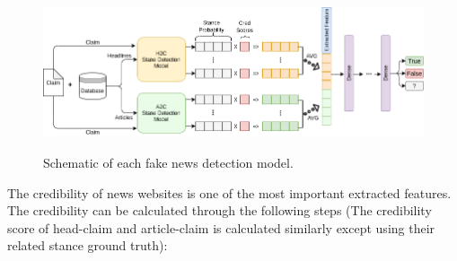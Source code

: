 \begin{figure}%
	\centering
	{\includegraphics[width=14.5cm]{statistics/schema/fn.png} }
	\caption{Schematic of each fake news detection model.}%
	\label{fig:fnschm}%
\end{figure}

The credibility of news websites is one of the most important extracted features. The credibility can be calculated through the following steps (The credibility score of head-claim and article-claim is calculated similarly except using their related stance ground truth):

